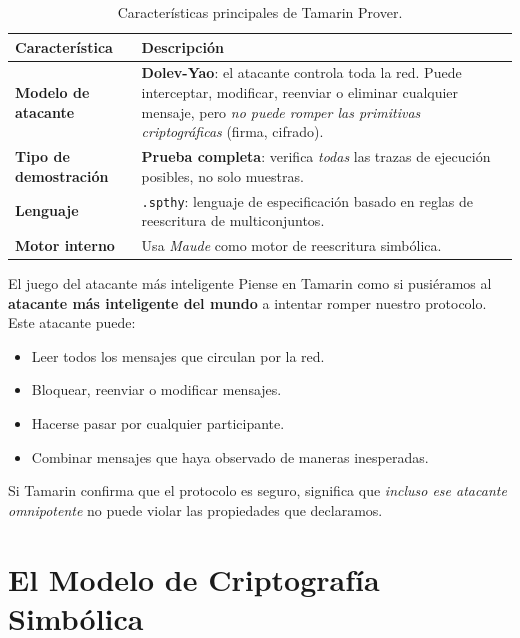 \documentclass[12pt, a4paper]{article}
\begin{document}
\begin{table}[h!]
\centering
\begin{tabular}{>{\bfseries}p{3.5cm} p{9cm}}
\toprule
Característica & Descripción \\
\midrule
Modelo de atacante & \textbf{Dolev-Yao}: el atacante controla toda la red.
                     Puede interceptar, modificar, reenviar o eliminar cualquier
                     mensaje, pero \textit{no puede romper las primitivas
                     criptográficas} (firma, cifrado). \\[4pt]
Tipo de demostración & \textbf{Prueba completa}: verifica \textit{todas} las
                       trazas de ejecución posibles, no solo muestras. \\[4pt]
Lenguaje & \texttt{.spthy}: lenguaje de especificación basado en reglas de
           reescritura de multiconjuntos. \\[4pt]
Motor interno & Usa \textit{Maude} como motor de reescritura simbólica. \\
\bottomrule
\end{tabular}
\caption{Características principales de Tamarin Prover.}
\end{table}

\begin{cajaAnalogía}{El juego del atacante más inteligente}
Piense en Tamarin como si pusiéramos al \textbf{atacante más inteligente del
mundo} a intentar romper nuestro protocolo. Este atacante puede:
\begin{itemize}[itemsep=0pt]
  \item Leer todos los mensajes que circulan por la red.
  \item Bloquear, reenviar o modificar mensajes.
  \item Hacerse pasar por cualquier participante.
  \item Combinar mensajes que haya observado de maneras inesperadas.
\end{itemize}
Si Tamarin confirma que el protocolo es seguro, significa que \textit{incluso
ese atacante omnipotente} no puede violar las propiedades que declaramos.
\end{cajaAnalogía}

\section{El Modelo de Criptografía Simbólica}
\end{document}
